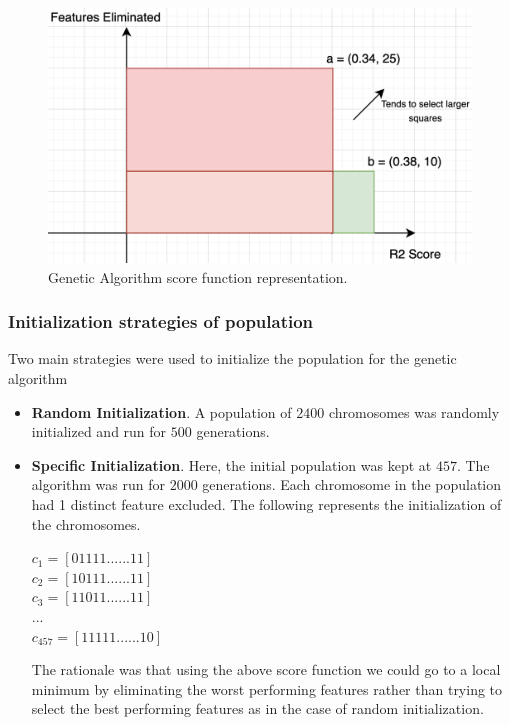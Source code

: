 \documentclass[11pt]{article}
\begin{document}
\begin{figure}[htb]
  \centering
    \includegraphics[scale=0.5]{images/scoreFuntionMultiObject}
    \caption{Genetic Algorithm score function representation.}
    \label{fig:scorefunctionfigure}
\end{figure}

\subsubsection{Initialization strategies of population}
Two main strategies were used to initialize the population for the genetic algorithm
\begin{itemize}
\item \textbf{Random Initialization}.  A population of $2400$ chromosomes was randomly initialized and run for $500$ generations.
\item \textbf{Specific Initialization}.  Here,  the initial population was kept at $457$.
The algorithm was run for $2000$ generations.
Each chromosome in the population had 1 distinct feature excluded.  The following represents the initialization of the chromosomes.

$
c_1 = [0 1 1 1 1 ......  1 1]
$ \\
$
c_2 = [1 0 1 1 1 ......  1 1]
$ \\
$
c_3 = [1 1 0 1 1 ......  1 1]
$ \\
$
... 
$ \\
$
c_{457} = [1 1 1 1 1 ......  1 0]
$

The rationale was that using the above score function we could go to a local minimum by eliminating the worst performing features rather than trying to select the best performing features as in the case of random initialization.
\end{itemize}
\end{document}
